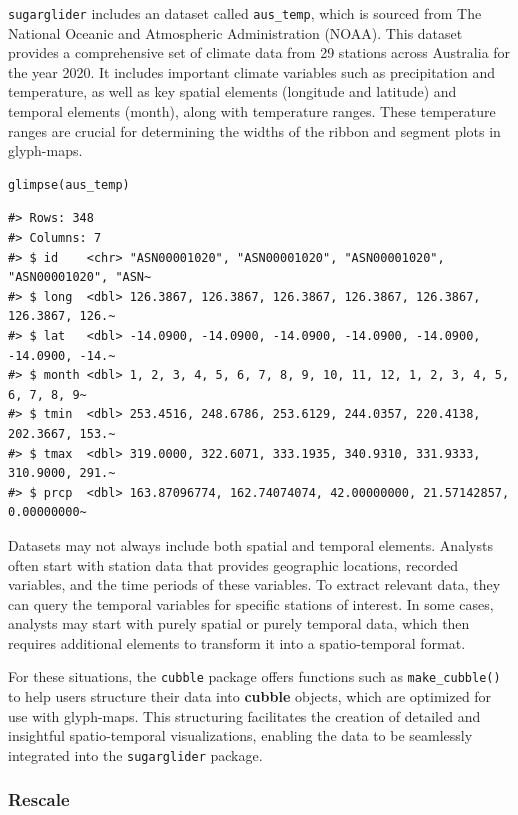 \texttt{sugarglider} includes an dataset called \texttt{aus\_temp}, which is sourced from The National Oceanic and Atmospheric Administration (NOAA). This dataset provides a comprehensive set of climate data from 29 stations across Australia for the year 2020. It includes important climate variables such as precipitation and temperature, as well as key spatial elements (longitude and latitude) and temporal elements (month), along with temperature ranges. These temperature ranges are crucial for determining the widths of the ribbon and segment plots in glyph-maps.

\begin{verbatim}
glimpse(aus_temp)
\end{verbatim}

\begin{verbatim}
#> Rows: 348
#> Columns: 7
#> $ id    <chr> "ASN00001020", "ASN00001020", "ASN00001020", "ASN00001020", "ASN~
#> $ long  <dbl> 126.3867, 126.3867, 126.3867, 126.3867, 126.3867, 126.3867, 126.~
#> $ lat   <dbl> -14.0900, -14.0900, -14.0900, -14.0900, -14.0900, -14.0900, -14.~
#> $ month <dbl> 1, 2, 3, 4, 5, 6, 7, 8, 9, 10, 11, 12, 1, 2, 3, 4, 5, 6, 7, 8, 9~
#> $ tmin  <dbl> 253.4516, 248.6786, 253.6129, 244.0357, 220.4138, 202.3667, 153.~
#> $ tmax  <dbl> 319.0000, 322.6071, 333.1935, 340.9310, 331.9333, 310.9000, 291.~
#> $ prcp  <dbl> 163.87096774, 162.74074074, 42.00000000, 21.57142857, 0.00000000~
\end{verbatim}

Datasets may not always include both spatial and temporal elements. Analysts often start with station data that provides geographic locations, recorded variables, and the time periods of these variables. To extract relevant data, they can query the temporal variables for specific stations of interest. In some cases, analysts may start with purely spatial or purely temporal data, which then requires additional elements to transform it into a spatio-temporal format.

For these situations, the \texttt{cubble} package offers functions such as \texttt{make\_cubble()} to help users structure their data into \textbf{cubble} objects, which are optimized for use with glyph-maps. This structuring facilitates the creation of detailed and insightful spatio-temporal visualizations, enabling the data to be seamlessly integrated into the \texttt{sugarglider} package.

\hypertarget{rescale}{%
\subsubsection{Rescale}\label{rescale}}

